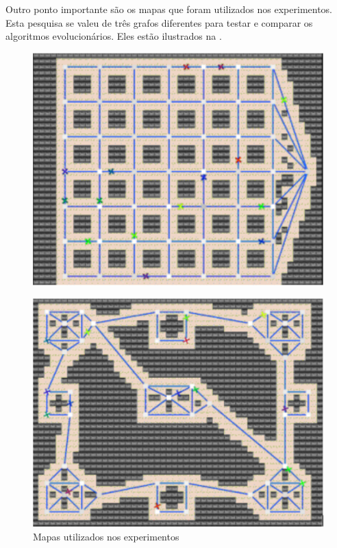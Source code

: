 Outro ponto importante são os mapas que foram utilizados nos experimentos. Esta 
pesquisa se valeu de três grafos diferentes para testar e comparar os algoritmos 
evolucionários. Eles estão ilustrados na .

\begin{figure}[tp]
	\caption[Mapas utilizados nos experimentos]{Mapas utilizados nos 
		experimentos}
	\centering
	\begin{minipage}{0.5\textwidth}
		\centering
		\includegraphics[width=0.9\linewidth]{images/mapa_grid.png}
		\label{fig:grid}
	\end{minipage}\hfill
	\begin{minipage}{0.5\textwidth}
		\centering
		\includegraphics[width=0.9\linewidth]{images/mapa_ilhas.png}

\end{minipage}
\end{figure}
